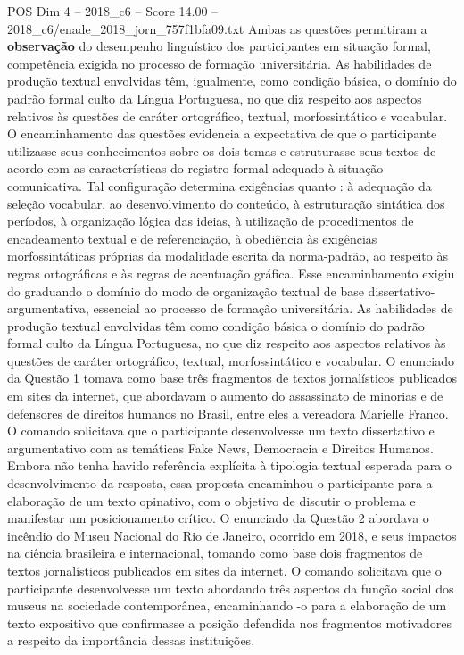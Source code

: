 \begin{textsample}{POS Dim 4 – 2018\_c6 – Score 14.00 – 2018\_c6/enade\_2018\_jorn\_757f1bfa09.txt}
Ambas as questões permitiram a \textbf{observação} do desempenho linguístico dos participantes em situação formal, competência exigida no processo de formação universitária.
As habilidades de produção textual envolvidas têm, igualmente, como condição básica, o domínio do padrão formal culto da Língua Portuguesa, no que diz respeito aos aspectos relativos às questões de caráter ortográfico, textual, morfossintático e vocabular.
O encaminhamento das questões evidencia a expectativa de que o participante utilizasse seus conhecimentos sobre os dois temas e estruturasse seus textos de acordo com as características do registro formal adequado à situação comunicativa.
Tal configuração determina exigências quanto : à adequação da seleção vocabular, ao desenvolvimento do conteúdo, à estruturação sintática dos períodos, à organização lógica das ideias, à utilização de procedimentos de encadeamento textual e de referenciação, à obediência às exigências morfossintáticas próprias da modalidade escrita da norma-padrão, ao respeito às regras ortográficas e às regras de acentuação gráfica.
Esse encaminhamento exigiu do graduando o domínio do modo de organização textual de base dissertativo-argumentativa, essencial ao processo de formação universitária.
As habilidades de produção textual envolvidas têm como condição básica o domínio do padrão formal culto da Língua Portuguesa, no que diz respeito aos aspectos relativos às questões de caráter ortográfico, textual, morfossintático e vocabular.
O enunciado da Questão 1 tomava como base três fragmentos de textos jornalísticos publicados em sites da internet, que abordavam o aumento do assassinato de minorias e de defensores de direitos humanos no Brasil, entre eles a vereadora Marielle Franco.
O comando solicitava que o participante desenvolvesse um texto dissertativo e argumentativo com as temáticas Fake News, Democracia e Direitos Humanos.
Embora não tenha havido referência explícita à tipologia textual esperada para o desenvolvimento da resposta, essa proposta encaminhou o participante para a elaboração de um texto opinativo, com o objetivo de discutir o problema e manifestar um posicionamento crítico.
O enunciado da Questão 2 abordava o incêndio do Museu Nacional do Rio de Janeiro, ocorrido em 2018, e seus impactos na ciência brasileira e internacional, tomando como base dois fragmentos de textos jornalísticos publicados em sites da internet.
O comando solicitava que o participante desenvolvesse um texto abordando três aspectos da função social dos museus na sociedade contemporânea, encaminhando -o para a elaboração de um texto expositivo que confirmasse a posição defendida nos fragmentos motivadores a respeito da importância dessas instituições.

\end{textsample}
